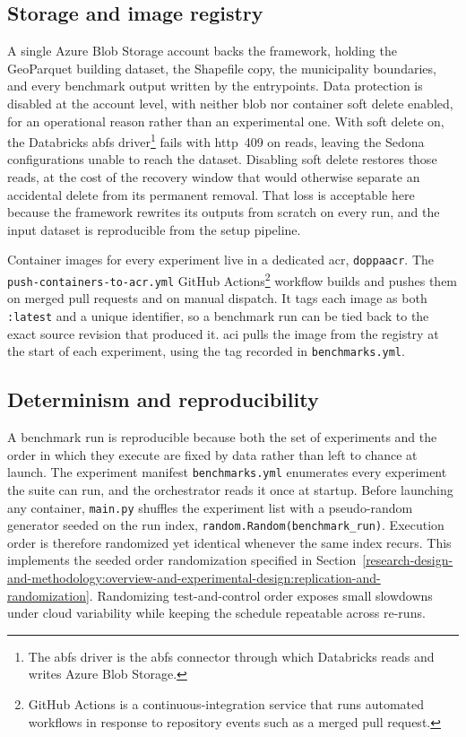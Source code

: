 \subsection{Storage and image registry}
\label{system-architecture-and-implementation:infrastructure:storage-and-image-registry}
A single Azure Blob Storage account backs the framework, holding the GeoParquet building dataset, the Shapefile copy, the municipality boundaries, and every benchmark output written by the entrypoints. Data protection is disabled at the account level, with neither blob nor container soft delete enabled, for an operational reason rather than an experimental one. With soft delete on, the Databricks \acrfull{abfs} driver\footnote{The \acrshort{abfs} driver is the \acrlong{abfs} connector through which Databricks reads and writes Azure Blob Storage.} fails with \acrshort{http}~409 on reads, leaving the Sedona configurations unable to reach the dataset. Disabling soft delete restores those reads, at the cost of the recovery window that would otherwise separate an accidental delete from its permanent removal. That loss is acceptable here because the framework rewrites its outputs from scratch on every run, and the input dataset is reproducible from the setup pipeline.

Container images for every experiment live in a dedicated \acrfull{acr}, \texttt{doppaacr}. The \texttt{push-containers-to-acr.yml} GitHub Actions\footnote{GitHub Actions is a continuous-integration service that runs automated workflows in response to repository events such as a merged pull request.} workflow builds and pushes them on merged pull requests and on manual dispatch. It tags each image as both \texttt{:latest} and a unique identifier, so a benchmark run can be tied back to the exact source revision that produced it. \acrshort{aci} pulls the image from the registry at the start of each experiment, using the tag recorded in \texttt{benchmarks.yml}.

\subsection{Determinism and reproducibility}
\label{system-architecture-and-implementation:infrastructure:determinism-and-reproducibility}

A benchmark run is reproducible because both the set of experiments and the order in which they execute are fixed by data rather than left to chance at launch. The experiment manifest \texttt{benchmarks.yml} enumerates every experiment the suite can run, and the orchestrator reads it once at startup. Before launching any container, \texttt{main.py} shuffles the experiment list with a pseudo-random generator seeded on the run index, \texttt{random.Random(benchmark\_run)}. Execution order is therefore randomized yet identical whenever the same index recurs. This implements the seeded order randomization specified in Section~\ref{research-design-and-methodology:overview-and-experimental-design:replication-and-randomization}. Randomizing test-and-control order exposes small slowdowns under cloud variability while keeping the schedule repeatable across re-runs.

